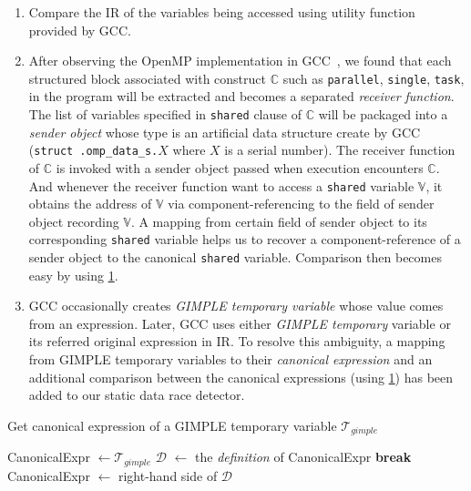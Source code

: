 \begin{enumerate}
	\label{Alias-Analysis-Technique-1}\item Compare the IR of the variables being accessed using utility function provided by GCC.
	\item After observing the OpenMP implementation in GCC~\cite{Novillo:2006p1243}, we found that each structured block associated with construct $\mathbb{C}$ such as \texttt{parallel}, \texttt{single}, \texttt{task}, \etc{} in the program will be extracted and becomes a separated \textit{receiver function}. The list of variables specified in \texttt{shared} clause of $\mathbb{C}$ will be packaged into a \textit{sender object} whose type is an artificial data structure create by GCC (\ie \verb|struct .omp_data_s.|$X$ where $X$ is a serial number). The receiver function of $\mathbb{C}$ is invoked with a sender object passed when execution encounters $\mathbb{C}$. And whenever the receiver function want to access a \texttt{shared} variable $\mathbb{V}$, it obtains the address of $\mathbb{V}$ via component-referencing to the field of sender object recording $\mathbb{V}$. A mapping from certain field of sender object to its corresponding \texttt{shared} variable helps us to recover a component-reference of a sender object to the canonical \texttt{shared} variable. Comparison then becomes easy by using \hyperref[Alias-Analysis-Technique-1]{1}.
	\item GCC occasionally creates \textit{GIMPLE temporary variable} whose value comes from an expression. Later, GCC uses either \textit{GIMPLE temporary} variable or its referred original expression in IR. To resolve this ambiguity, a mapping from GIMPLE temporary variables to their \textit{canonical expression} and an additional comparison between the canonical expressions (using \hyperref[Alias-Analysis-Technique-1]{1}) has been added to our static data race detector.
\end{enumerate}

\begin{algorithm}
	\caption{Get canonical expression of a GIMPLE temporary variable $\mathcal{T}_{gimple}$}
	\label{a:find-canonical-expr-pseudocode}
	\begin{algorithmic}[1]
			\State CanonicalExpr $\gets \mathcal{T}_{gimple}$
			\Repeat
				\State $\mathcal{D}$ $\gets$ the \textit{definition} of CanonicalExpr
					\State \textbf{break}
				\Else
					\State CanonicalExpr $\gets$ right-hand side of $\mathcal{D}$
				\EndIf
		\EndProcedure
	\end{algorithmic}
\end{algorithm}

